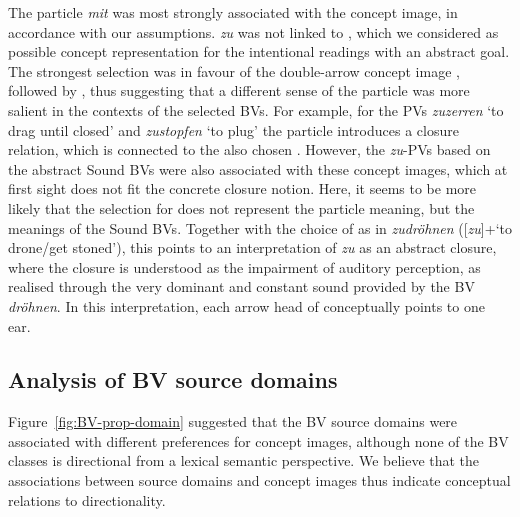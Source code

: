 \documentclass[output=paper]{langsci/langscibook}
\begin{document}
The particle \textit{mit} was most strongly associated with the
 concept image, in accordance with our assumptions. \textit{zu}
was not linked to , which we considered as
possible concept representation for the intentional readings with an
abstract goal. The strongest selection was in favour of the
double-arrow concept image , followed by , thus
suggesting that a different sense of the particle was more salient in
the contexts of the selected BVs. For example, for the PVs
\textit{zuzerren} `to drag until closed' and \textit{zustopfen} `to
plug' the particle introduces a closure relation, which is connected
to the also chosen . However, the \textit{zu}-PVs
based on the abstract Sound BVs were also associated with
these concept images, which at first sight does not fit the concrete closure
notion. Here, it seems to be more likely that the selection for
 does not represent the particle meaning, but the
meanings of the Sound BVs. Together with the choice of
 as in \textit{zudröhnen} ([\textit{zu}]+`to drone/get
stoned'), this points to an interpretation of \textit{zu} as an
abstract closure, where the closure is understood as the impairment of
auditory perception, as realised through the very dominant and
constant sound provided by the BV \textit{dröhnen}. In this
interpretation, each arrow head of  conceptually
points to one ear.

\subsection{Analysis of BV source domains}
\label{sec:disc-domain}

Figure~\ref{fig:BV-prop-domain} suggested that the BV source domains
were associated with different preferences for concept images,
although none of the BV classes is directional from a lexical semantic
perspective. We believe that the associations between source domains
and concept images thus indicate conceptual relations to
directionality.
\end{document}
